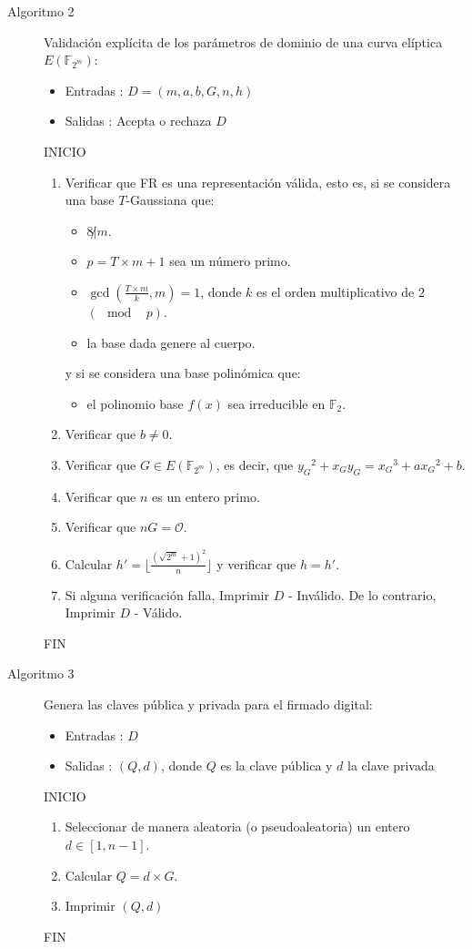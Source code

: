 \documentclass[11pt]{article}
\newcommand{\F}{\mathbb{F}}
\newcommand{\Fm}{\F_{2^m}}
\numberwithin{equation}{section} %
\numberwithin{figure}{section} %
\numberwithin{table}{section} %
\begin{document}
\begin{description}
			\item[Algoritmo 2] Validación explícita de los parámetros de dominio de una curva elíptica $E(\Fm)$:%
			\begin{itemize}
				\item Entradas : $D=(m,a,b,G,n,h)$
				\item Salidas : Acepta o rechaza $D$
			\end{itemize}
			INICIO
			\begin{enumerate}
				\item Verificar que FR es una representación válida, esto es, si se considera una base $T$-Gaussiana que:
				\begin{itemize}
					\item $8\not| m$.
					\item $p=T\times m + 1$ sea un número primo.
					\item $\gcd(\frac{T\times m}{k},m)=1$, donde $k$ es el orden multiplicativo de $2$ $(\mod\text{ }p)$.
					\item la base dada genere al cuerpo.
				\end{itemize}
				y si se considera una base polinómica que:
				\begin{itemize}
					\item el polinomio base $f(x)$ sea irreducible en $\F_2$.
				\end{itemize}
				\item Verificar que $b\neq 0$.
				\item Verificar que $G\in E(\Fm)$, es decir, que ${y_G}^2+x_G y_G={x_G}^3+a{x_G}^2+b$.
				\item Verificar que $n$ es un entero primo.
				\item Verificar que $nG=\mathcal{O}$.
				\item Calcular $h\prime =\lfloor\frac{(\sqrt{2^m}+1)^2}{n}\rfloor$ y verificar que $h=h\prime$.
				\item Si alguna verificación falla, Imprimir $D$ - Inválido. De lo contrario, Imprimir $D$ - Válido.
			\end{enumerate}
			FIN

			\item[Algoritmo 3] Genera las claves pública y privada para el firmado digital:%
			\begin{itemize}
				\item Entradas : $D$
				\item Salidas : $(Q,d)$, donde $Q$ es la clave pública y $d$ la clave privada
			\end{itemize}
			INICIO
			\begin{enumerate}
				\item Seleccionar de manera aleatoria (o pseudoaleatoria) un entero $d\in[1,n-1]$.
				\item Calcular $Q=d\times G$.
				\item Imprimir $(Q,d)$
			\end{enumerate}
			FIN


\end{description}
\end{document}
